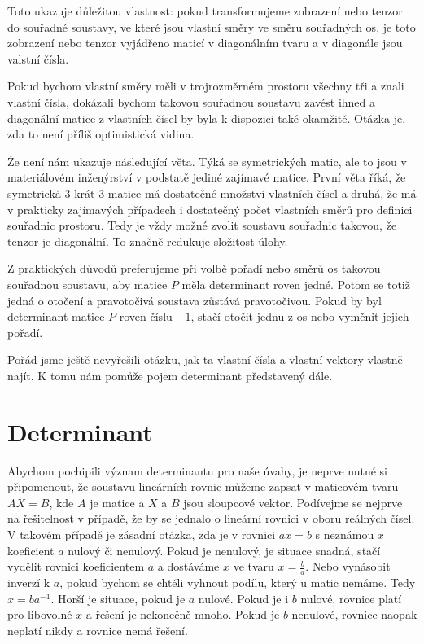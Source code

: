 \documentclass[12pt]{article}
\begin{document}
Toto ukazuje důležitou vlastnost: pokud transformujeme zobrazení nebo tenzor do souřadné soustavy, ve které jsou vlastní směry ve směru souřadných os, je toto zobrazení nebo tenzor vyjádřeno maticí v diagonálním tvaru a v diagonále jsou valstní čísla.

Pokud bychom vlastní směry měli v trojrozměrném prostoru všechny tři a znali vlastní čísla, dokázali bychom takovou souřadnou soustavu zavést ihned a diagonální matice z vlastních čísel by byla k dispozici také okamžitě. Otázka je, zda to není příliš optimistická vidina.

Že není nám ukazuje následující věta. Týká se symetrických matic, ale to jsou v materiálovém inženýrství v podstatě jediné zajímavé matice.  První věta říká, že symetrická 3 krát 3 matice má dostatečné množství vlastních čísel a druhá, že má v prakticky zajímavých případech i dostatečný počet vlastních směrů pro definici souřadnic prostoru. Tedy je vždy možné zvolit soustavu souřadnic takovou, že tenzor je diagonální. To značně redukuje složitost úlohy.

Z praktických důvodů preferujeme při volbě pořadí nebo směrů os takovou souřadnou soustavu, aby matice $P$ měla determinant roven jedné. Potom se totiž jedná o otočení a pravotočivá soustava zůstává pravotočivou. Pokud by byl determinant matice $P$ roven číslu $-1$, stačí otočit jednu z os nebo vyměnit jejich pořadí. 

Pořád jsme ještě nevyřešili otázku, jak ta vlastní čísla a vlastní vektory vlastně najít. K tomu nám pomůže pojem determinant představený dále.

\section{Determinant}

Abychom pochipili význam determinantu pro naše úvahy, je neprve nutné si připomenout, že soustavu lineárních rovnic můžeme zapsat v maticovém tvaru $AX=B$, kde $A$ je matice a $X$ a $B$ jsou sloupcové vektor. Podívejme se nejprve na řešitelnost v případě, že by se jednalo o lineární rovnici v oboru reálných čísel. V takovém  případě je zásadní otázka, zda je v rovnici $ax=b$ s neznámou $x$ koeficient $a$ nulový či nenulový. Pokud je nenulový, je situace snadná, stačí vydělit rovnici koeficientem $a$ a dostáváme $x$ ve tvaru $x=\frac ba$. Nebo vynásobit inverzí k $a$, pokud bychom se chtěli vyhnout podílu, který u matic nemáme. Tedy $x=b a^{-1}.$ Horší je situace, pokud je $a$ nulové. Pokud je i $b$ nulové, rovnice platí pro libovolné $x$ a řešení je nekonečně mnoho. Pokud je $b$ nenulové, rovnice naopak neplatí nikdy a rovnice nemá řešení.
\end{document}
